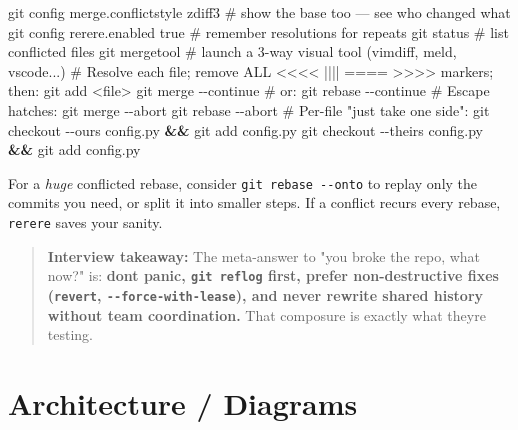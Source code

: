 \documentclass[11pt]{article}
\newenvironment{Shaded}{\begin{snugshade}}{\end{snugshade}}
\newcommand{\AttributeTok}[1]{\textcolor[rgb]{0.16,0.50,0.73}{#1}}
\newcommand{\CommentTok}[1]{\textcolor[rgb]{0.48,0.49,0.49}{#1}}
\newcommand{\FunctionTok}[1]{\textcolor[rgb]{0.56,0.27,0.68}{#1}}
\newcommand{\KeywordTok}[1]{\textcolor[rgb]{0.81,0.81,0.76}{\textbf{#1}}}
\newcommand{\NormalTok}[1]{\textcolor[rgb]{0.81,0.81,0.76}{#1}}
\newcommand{\OperatorTok}[1]{\textcolor[rgb]{0.81,0.81,0.76}{#1}}
\begin{document}
\begin{Shaded}
\begin{Highlighting}[]
\FunctionTok{git}\NormalTok{ config merge.conflictstyle zdiff3   }\CommentTok{\# show the base too — see who changed what}
\FunctionTok{git}\NormalTok{ config rerere.enabled true          }\CommentTok{\# remember resolutions for repeats}
\FunctionTok{git}\NormalTok{ status                              }\CommentTok{\# list conflicted files}
\FunctionTok{git}\NormalTok{ mergetool                           }\CommentTok{\# launch a 3{-}way visual tool (vimdiff, meld, vscode...)}
\CommentTok{\# Resolve each file; remove ALL \textless{}\textless{}\textless{}\textless{} |||| ==== \textgreater{}\textgreater{}\textgreater{}\textgreater{} markers; then:}
\FunctionTok{git}\NormalTok{ add }\OperatorTok{\textless{}}\NormalTok{file}\OperatorTok{\textgreater{}}
\FunctionTok{git}\NormalTok{ merge }\AttributeTok{{-}{-}continue}      \CommentTok{\# or: git rebase {-}{-}continue}
\CommentTok{\# Escape hatches:}
\FunctionTok{git}\NormalTok{ merge }\AttributeTok{{-}{-}abort}
\FunctionTok{git}\NormalTok{ rebase }\AttributeTok{{-}{-}abort}
\CommentTok{\# Per{-}file "just take one side":}
\FunctionTok{git}\NormalTok{ checkout }\AttributeTok{{-}{-}ours}\NormalTok{  config.py }\KeywordTok{\&\&} \FunctionTok{git}\NormalTok{ add config.py}
\FunctionTok{git}\NormalTok{ checkout }\AttributeTok{{-}{-}theirs}\NormalTok{ config.py }\KeywordTok{\&\&} \FunctionTok{git}\NormalTok{ add config.py}
\end{Highlighting}
\end{Shaded}

For a \emph{huge} conflicted rebase, consider \texttt{git\ rebase\ -\/-onto} to replay only the commits you need, or split it into smaller steps. If a conflict recurs every rebase, \texttt{rerere} saves your sanity.

\begin{quote}
\textbf{Interview takeaway:} The meta-answer to "you broke the repo, what now?" is: \textbf{don\textquotesingle t panic, \texttt{git\ reflog} first, prefer non-destructive fixes (\texttt{revert}, \texttt{-\/-force-with-lease}), and never rewrite shared history without team coordination.} That composure is exactly what they\textquotesingle re testing.
\end{quote}

\section{Architecture / Diagrams}\label{architecture--diagrams}
\end{document}

